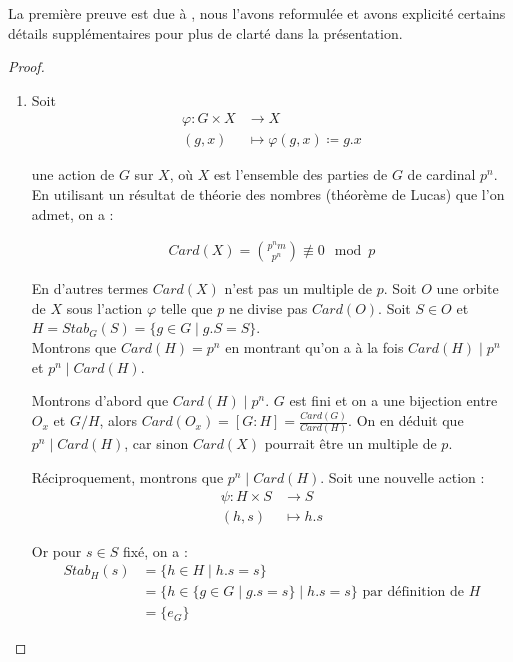 \documentclass[french]{article}
\theoremstyle{definition}
\theoremstyle{plain}
\theoremstyle{plain}
\theoremstyle{plain}
\theoremstyle{plain}
\theoremstyle{plain}
\begin{document}
\par La première preuve est due à \cite[p.~216-218]{chen2024napkin}, nous l'avons reformulée et avons explicité certains détails supplémentaires pour plus de clarté dans la présentation.
\begin{proof}
	\begin{enumerate}[label={\upshape(\roman*)}]
		\item 
Soit
\begin{align*}
	\varphi : G \times X &\to X \\
	(g,x) &\mapsto \varphi(g,x) \coloneq g.x
\end{align*}

une action de \( G \) sur \( X \), où \( X \) est l'ensemble des parties de \( G \) de cardinal \( p^{n} \). En utilisant un résultat de théorie des nombres (théorème de Lucas) que l'on admet, on a :

\begin{align*}
	Card(X) = \binom{p^{n}m}{p^{n}} \not\equiv 0 \mod  p 
\end{align*}


En d'autres termes \( Card(X) \) n'est pas un multiple de \( p \).
Soit \( O \) une orbite de \( X \) sous l'action \( \varphi \) telle que \( p \) ne divise pas \( Card(O) \). Soit \( S \in O \) et \( H = Stab_{G}({S}) = \{ g \in G \mid g.S = S \} \). \\
Montrons que \( Card(H) = p^{n} \) en montrant qu'on a à la fois \( Card(H) \mid p^{n} \) et \( p^{n} \mid Card(H) \).

\par Montrons d'abord que \( Card(H) \mid p^{n} \). \( G \) est fini et on a une bijection entre \( O_x \) et \( G/H \), alors \( Card(O_{x}) = [G : H]  = \frac{Card(G)}{Card(H)} \).
On en déduit que \( p^{n} \mid Card(H) \), car sinon \( Card(X) \) pourrait être un multiple de \( p \).

\par Réciproquement, montrons que \( p^{n} \mid Card(H) \). Soit une nouvelle action :
\begin{align*}
	\psi : H \times S &\to S \\
	(h,s) &\mapsto h.s
\end{align*}

Or pour \( s \in S \) fixé, on a :
\begin{align*}
	Stab_{H}({s}) &= \{ h \in H \mid h.s = s \} \\ 
		      &= \{ h \in \{g \in G \mid g.s = s \} \mid h.s = s \} \text{ par définition de } H\\
	&= \{e_{G}\} 
\end{align*}



\end{enumerate}
\end{proof}
\end{document}
